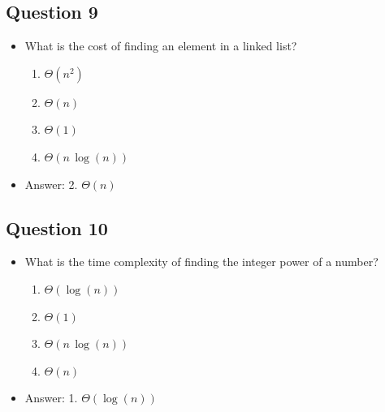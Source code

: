 \begin{slide}
\section[-1]{Question 9}

\begin{PauseHighLight}
  \begin{itemize}
  \item What is the cost of finding an element in a linked list?
    \begin{enumerate}
    \item $\Theta(n^2)$
    \item $\Theta(n)$
    \item $\Theta(1)$
    \item $\Theta(n\,\log(n))$\pause
    \end{enumerate}
  \item Answer: 2. $\Theta(n)$\pauseb
  \end{itemize}
\end{PauseHighLight}
\end{slide}

\begin{slide}
\section[-1]{Question 10}

\begin{PauseHighLight}
  \begin{itemize}
  \item What is the time complexity of finding the integer power of a number?
    \begin{enumerate}
    \item $\Theta(\log(n))$
    \item $\Theta(1)$
    \item $\Theta(n\,\log(n))$
    \item $\Theta(n)$\pause
    \end{enumerate}
  \item Answer: 1. $\Theta(\log(n))$\pauseb
  \end{itemize}
\end{PauseHighLight}
\end{slide}

